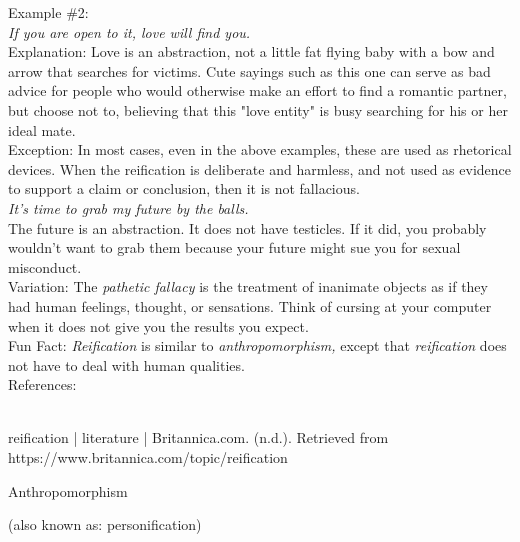 \documentclass[a4paper,12pt,single,pdftex]{scrartcl}
\begin{document}
    
      Example \#2:
    \\

    
      {\em If you are open to it, love will find you.}
    \\

    
      Explanation:  Love is an abstraction, not a little fat flying baby with a bow and arrow that searches for victims.  Cute sayings such as this one can serve as bad advice for people who would otherwise make an effort to find a romantic partner, but choose not to, believing that this "love entity" is busy searching for his or her ideal mate.
    \\

    
      Exception: In most cases, even in the above examples, these are used as rhetorical devices. When the reification is deliberate and harmless, and not used as evidence to support a claim or conclusion, then it is not fallacious.
    \\

    
      {\em It’s time to grab my future by the balls.}
    \\

    
      The future is an abstraction. It does not have testicles. If it did, you probably wouldn’t want to grab them because your future might sue you for sexual misconduct.
    \\

    
      Variation: The {\it pathetic fallacy} is the treatment of inanimate objects as if they had human feelings, thought, or sensations.  Think of cursing at your computer when it does not give you the results you expect.
    \\

    
      Fun Fact: {\em Reification} is similar to {\it anthropomorphism}{\em ,}  except that {\em reification} does not have to deal with human qualities.
    \\

    References:

    
      
        
      \\

      
        
          reification | literature | Britannica.com. (n.d.). Retrieved from https://www.britannica.com/topic/reification
        
      
    
  

Anthropomorphism
    
      (also known as: personification)
    \\
\end{document}
